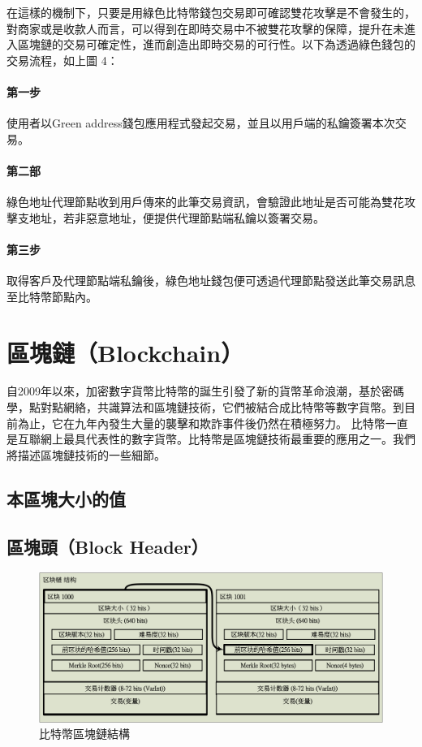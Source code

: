 		 	在這樣的機制下，只要是用綠色比特幣錢包交易即可確認雙花攻擊是不會發生的，對商家或是收款人而言，可以得到在即時交易中不被雙花攻擊的保障，提升在未進入區塊鏈的交易可確定性，進而創造出即時交易的可行性。以下為透過綠色錢包的交易流程，如上圖 4：

		 	\paragraph{第一步}使用者以Green address錢包應用程式發起交易，並且以用戶端的私鑰簽署本次交易。
		 	\paragraph{第二部}綠色地址代理節點收到用戶傳來的此筆交易資訊，會驗證此地址是否可能為雙花攻擊支地址，若非惡意地址，便提供代理節點端私鑰以簽署交易。
		 	\paragraph{第三步}取得客戶及代理節點端私鑰後，綠色地址錢包便可透過代理節點發送此筆交易訊息至比特幣節點內。



	\section{區塊鏈（Blockchain）}
	自2009年以來，加密數字貨幣比特幣的誕生引發了新的貨幣革命浪潮，基於密碼學，點對點網絡，共識算法和區塊鏈技術，它們被結合成比特幣等數字貨幣。到目前為止，它在九年內發生大量的襲擊和欺詐事件後仍然在積極努力。 比特幣一直是互聯網上最具代表性的數字貨幣。比特幣是區塊鏈技術最重要的應用之一。我們將描述區塊鏈技術的一些細節。

		\subsection{本區塊大小的值 }
		\subsection{區塊頭（Block Header）}

		\begin{figure}[h]
			\centering
			\includegraphics[width = 1\textwidth]{blockchain.png}
			\caption{比特幣區塊鏈結構}\label{blockchain}
		\end{figure}

